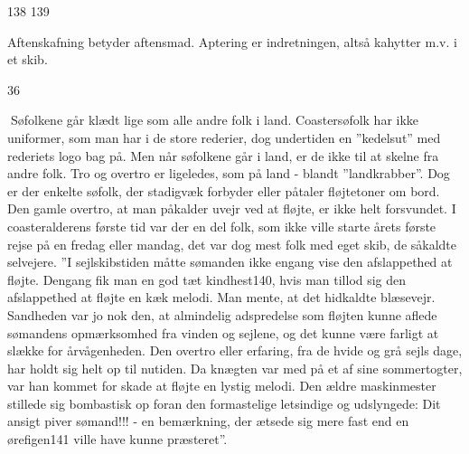 138 139

Aftenskafning betyder aftensmad. Aptering er indretningen, altså
kahytter m.v. i et skib.

36

Søfolkene går klædt lige som alle andre folk i land. Coastersøfolk har
ikke uniformer, som man har i de store rederier, dog undertiden en
''kedelsut'' med rederiets logo bag på. Men når søfolkene går i land, er
de ikke til at skelne fra andre folk. Tro og overtro er ligeledes, som
på land - blandt ''landkrabber''. Dog er der enkelte søfolk, der
stadigvæk forbyder eller påtaler fløjtetoner om bord. Den gamle overtro,
at man påkalder uvejr ved at fløjte, er ikke helt forsvundet. I
coasteralderens første tid var der en del folk, som ikke ville starte
årets første rejse på en fredag eller mandag, det var dog mest folk med
eget skib, de såkaldte selvejere. ''I sejlskibstiden måtte sømanden ikke
engang vise den afslappethed at fløjte. Dengang fik man en god tæt
kindhest140, hvis man tillod sig den afslappethed at fløjte en kæk
melodi. Man mente, at det hidkaldte blæsevejr. Sandheden var jo nok den,
at almindelig adspredelse som fløjten kunne aflede sømandens
opmærksomhed fra vinden og sejlene, og det kunne være farligt at slække
for årvågenheden. Den overtro eller erfaring, fra de hvide og grå sejls
dage, har holdt sig helt op til nutiden. Da knægten var med på et af
sine sommertogter, var han kommet for skade at fløjte en lystig melodi.
Den ældre maskinmester stillede sig bombastisk op foran den formastelige
letsindige og udslyngede: Dit ansigt piver sømand!!! - en bemærkning,
der ætsede sig mere fast end en ørefigen141 ville have kunne
præsteret''.
